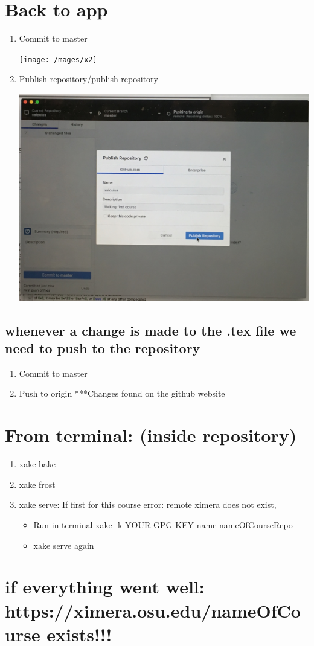 \documentclass{ximera}
\begin{document}
\section{Back to app}
\begin{enumerate}
\item Commit to master
\begin{center}
\texttt{[image: /mages/x2]}
\end{center}
\item Publish repository/publish repository   
\begin{center}
\includegraphics[scale=.09]{images/x3}
\end{center}
\end{enumerate}

\subsection{whenever a change is made to the .tex file we need to push to the repository}
\begin{enumerate}
\item Commit to master
\item Push to origin ***Changes found on the github website
\end{enumerate}

\section{From terminal: (inside repository)}
\begin{enumerate}
\item xake bake
\item	xake frost
\item	xake serve: If first for this course error: remote ximera does not exist,  
\begin{itemize}
\item Run in terminal xake -k YOUR-GPG-KEY name nameOfCourseRepo
\item xake serve again
\end{itemize}
\end{enumerate}

\section{if everything went well: https://ximera.osu.edu/nameOfCourse exists!!!}
\end{document}
